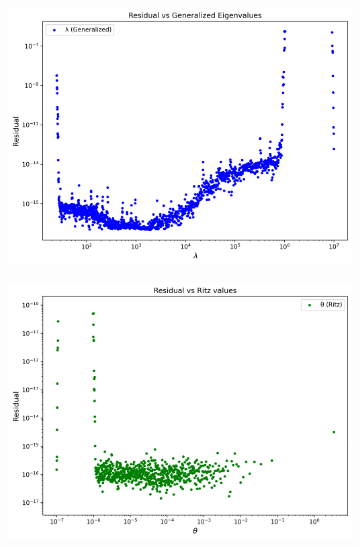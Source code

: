 \begin{figure}\label{fig:EigDecompResidualsLargeShift}
	\caption{Residuals plot with moderate shift $\sigma=1.5 \times 10^3$}
	\centering
	\begin{subfigure}{.5\textwidth}
		\centering
		\includegraphics[width=.8\linewidth]{./Plots/eigdecomp/residual_eig_gs.png}
		\caption{}
		\label{fig:EigGenResModerate}
	\end{subfigure}%
	\begin{subfigure}{.5\textwidth}
		\centering
		\includegraphics[width=.8\linewidth]{./Plots/eigdecomp/residual_eig_rs.png}
		\caption{}
		\label{fig:EigRitzResModerate}
	\end{subfigure}
	
	\vspace{0.5cm}
	

\end{figure}
